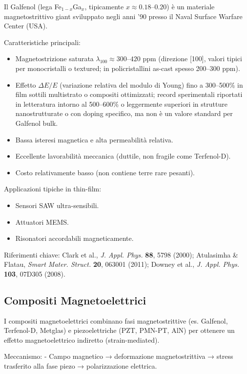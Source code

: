 \documentclass[11pt,a4paper]{article}
\begin{document}
Il Galfenol (lega Fe$_{1-x}$Ga$_x$, tipicamente $x \approx 0.18$--$0.20$) è un materiale magnetostrittivo giant sviluppato negli anni '90 presso il Naval Surface Warfare Center (USA).

Caratteristiche principali:
\begin{itemize}
    \item Magnetostrizione saturata $\lambda_{100} \approx 300$--$420$ ppm (direzione [100], valori tipici per monocristalli o textured; in policristallini as-cast spesso 200--300 ppm).
    \item Effetto $\Delta E/E$ (variazione relativa del modulo di Young) fino a 300--500\% in film sottili multistrato o compositi ottimizzati; record sperimentali riportati in letteratura intorno al 500--600\% o leggermente superiori in strutture nanostrutturate o con doping specifico, ma non è un valore standard per Galfenol bulk.
    \item Bassa isteresi magnetica e alta permeabilità relativa.
    \item Eccellente lavorabilità meccanica (duttile, non fragile come Terfenol-D).
    \item Costo relativamente basso (non contiene terre rare pesanti).
\end{itemize}

Applicazioni tipiche in thin-film:
\begin{itemize}
    \item Sensori SAW ultra-sensibili.
    \item Attuatori MEMS.
    \item Risonatori accordabili magneticamente.
\end{itemize}

Riferimenti chiave: 
Clark et al., \textit{J. Appl. Phys.} \textbf{88}, 5798 (2000); 
Atulasimha \& Flatau, \textit{Smart Mater. Struct.} \textbf{20}, 063001 (2011); 
Downey et al., \textit{J. Appl. Phys.} \textbf{103}, 07D305 (2008).

\subsection{Compositi Magnetoelettrici}

I compositi magnetoelettrici combinano fasi magnetostrittive (es. Galfenol, Terfenol-D, Metglas) e piezoelettriche (PZT, PMN-PT, AlN) per ottenere un effetto magnetoelettrico indiretto (strain-mediated).

Meccanismo:
- Campo magnetico → deformazione magnetostrittiva → stress trasferito alla fase piezo → polarizzazione elettrica.
\end{document}
